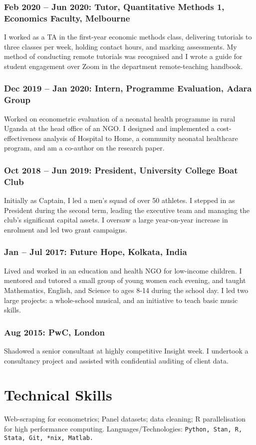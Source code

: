 \documentclass[a4]{article}
\renewenvironment{itemize}{
  \begin{list}{}{
    \setlength{\leftmargin}{1.5em}
  }
}{
  \end{list}
}
\begin{document}
\subsubsection*{Feb 2020 -- Jun 2020: Tutor, Quantitative Methods 1, Economics Faculty, Melbourne}
I worked as a TA in the first-year economic methods class, delivering tutorials to three classes per week, holding contact hours, and marking assessments. My method of conducting remote tutorials was recognised and I wrote a guide for student engagement over Zoom in the department remote-teaching handbook.

\subsubsection*{Dec 2019 -- Jan 2020: Intern, Programme Evaluation, Adara Group}
Worked on econometric evaluation of a neonatal health programme in rural Uganda at the head office of an NGO. I designed and implemented a cost-effectiveness analysis of Hospital to Home, a community neonatal healthcare program, and am a co-author on the research paper.
\subsubsection*{Oct 2018 -- Jun 2019: President, University College Boat Club}
Initially as Captain, I led a men’s squad of over 50 athletes. I stepped in as President during the second term, leading the executive team and managing the club’s significant capital assets. I oversaw a large year-on-year increase in enrolment and led two grant campaigns.
\subsubsection*{Jan -- Jul 2017: Future Hope, Kolkata, India}
Lived and worked in an education and health NGO for low-income children. I mentored and tutored a small group of young women each evening, and taught Mathematics, English, and Science to ages 8-14 during the school day. I led two large projects: a whole-school musical, and an initiative to teach basic music skills. 
\subsubsection*{Aug 2015: PwC, London}
Shadowed a senior consultant at highly competitive Insight week. I undertook a consultancy project and assisted with confidential auditing of client data.

\section*{Technical Skills}
\begin{itemize}
	\item Web-scraping for econometrics; Panel datasets; data cleaning; R parallelisation for high performance computing.  Languages/Technologies: \tt Python, Stan, R, Stata, Git, *nix, Matlab.
\end{itemize}
\end{document}
